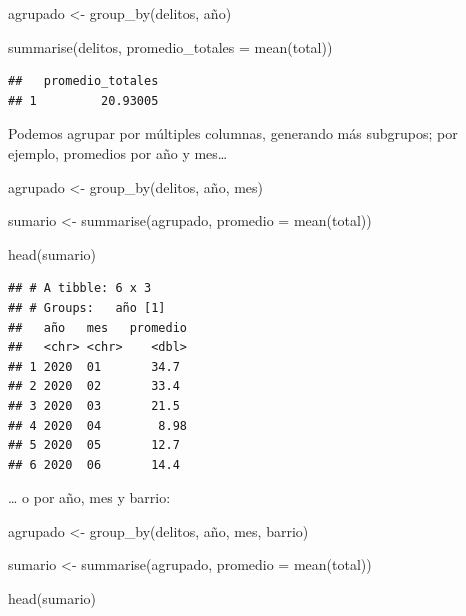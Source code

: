 \documentclass[
]{book}
\newenvironment{Shaded}{\begin{snugshade}}{\end{snugshade}}
\newcommand{\AttributeTok}[1]{\textcolor[rgb]{0.77,0.63,0.00}{#1}}
\newcommand{\FunctionTok}[1]{\textcolor[rgb]{0.00,0.00,0.00}{#1}}
\newcommand{\NormalTok}[1]{#1}
\newcommand{\OtherTok}[1]{\textcolor[rgb]{0.56,0.35,0.01}{#1}}
\begin{document}
\begin{Shaded}
\begin{Highlighting}[]
\NormalTok{agrupado }\OtherTok{\textless{}{-}} \FunctionTok{group\_by}\NormalTok{(delitos, año)}

\FunctionTok{summarise}\NormalTok{(delitos, }\AttributeTok{promedio\_totales =} \FunctionTok{mean}\NormalTok{(total))}
\end{Highlighting}
\end{Shaded}

\begin{verbatim}
##   promedio_totales
## 1         20.93005
\end{verbatim}

Podemos agrupar por múltiples columnas, generando más subgrupos; por ejemplo, promedios por año y mes\ldots{}

\begin{Shaded}
\begin{Highlighting}[]
\NormalTok{agrupado }\OtherTok{\textless{}{-}} \FunctionTok{group\_by}\NormalTok{(delitos, año, mes)}

\NormalTok{sumario }\OtherTok{\textless{}{-}} \FunctionTok{summarise}\NormalTok{(agrupado, }\AttributeTok{promedio =} \FunctionTok{mean}\NormalTok{(total))}

\FunctionTok{head}\NormalTok{(sumario)}
\end{Highlighting}
\end{Shaded}

\begin{verbatim}
## # A tibble: 6 x 3
## # Groups:   año [1]
##   año   mes   promedio
##   <chr> <chr>    <dbl>
## 1 2020  01       34.7 
## 2 2020  02       33.4 
## 3 2020  03       21.5 
## 4 2020  04        8.98
## 5 2020  05       12.7 
## 6 2020  06       14.4
\end{verbatim}

\ldots{} o por año, mes y barrio:

\begin{Shaded}
\begin{Highlighting}[]
\NormalTok{agrupado }\OtherTok{\textless{}{-}} \FunctionTok{group\_by}\NormalTok{(delitos, año, mes, barrio)}

\NormalTok{sumario }\OtherTok{\textless{}{-}} \FunctionTok{summarise}\NormalTok{(agrupado, }\AttributeTok{promedio =} \FunctionTok{mean}\NormalTok{(total))}

\FunctionTok{head}\NormalTok{(sumario)}
\end{Highlighting}
\end{Shaded}
\end{document}
